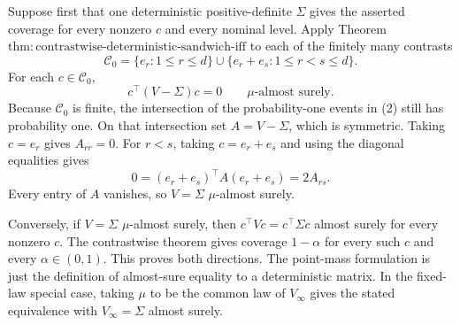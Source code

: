 Suppose first that one deterministic positive-definite \(\Sigma\) gives the asserted coverage for every nonzero \(c\) and every nominal level. Apply Theorem \(\mathrm{thm:contrastwise\text{-}deterministic\text{-}sandwich\text{-}iff}\) to each of the finitely many contrasts
\[
 \mathcal C_0=\{e_r:1\le r\le d\}\cup\{e_r+e_s:1\le r<s\le d\}. \tag{1}
\]
For each \(c\in\mathcal C_0\),
\[
 c^\top(V-\Sigma)c=0\qquad\mu\text{-almost surely}. \tag{2}
\]
Because \(\mathcal C_0\) is finite, the intersection of the probability-one events in (2) still has probability one. On that intersection set \(A=V-\Sigma\), which is symmetric. Taking \(c=e_r\) gives \(A_{rr}=0\). For \(r<s\), taking \(c=e_r+e_s\) and using the diagonal equalities gives
\[
 0=(e_r+e_s)^\top A(e_r+e_s)=2A_{rs}. \tag{3}
\]
Every entry of \(A\) vanishes, so \(V=\Sigma\) \(\mu\)-almost surely.

Conversely, if \(V=\Sigma\) \(\mu\)-almost surely, then \(c^\top Vc=c^\top\Sigma c\) almost surely for every nonzero \(c\). The contrastwise theorem gives coverage \(1-\alpha\) for every such \(c\) and every \(\alpha\in(0,1)\). This proves both directions. The point-mass formulation is just the definition of almost-sure equality to a deterministic matrix. In the fixed-law special case, taking \(\mu\) to be the common law of \(V_\infty\) gives the stated equivalence with \(V_\infty=\Sigma\) almost surely.